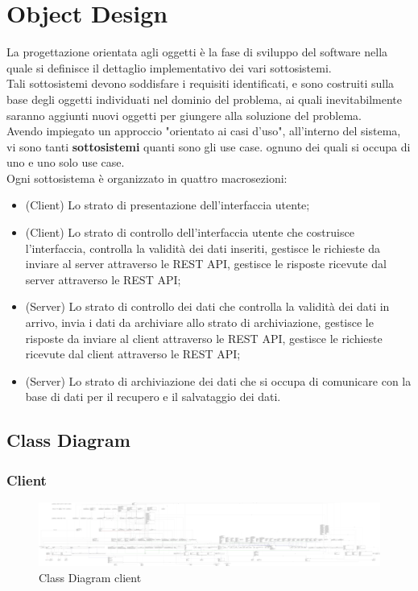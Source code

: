 \chapter{Object Design}
    La progettazione orientata agli oggetti è la fase di sviluppo del software nella quale si definisce il dettaglio implementativo dei vari sottosistemi. \\
    Tali sottosistemi devono soddisfare i requisiti identificati, e sono costruiti sulla base degli oggetti individuati nel dominio del problema, ai quali inevitabilmente saranno aggiunti nuovi oggetti per giungere alla soluzione del problema. \\
    Avendo impiegato un approccio "orientato ai casi d'uso", all'interno del sistema, vi sono tanti \textbf{sottosistemi} quanti sono gli use case. ognuno dei quali si occupa di uno e uno solo use case. \\
    Ogni sottosistema è organizzato in quattro macrosezioni:
    \begin{itemize}
        \item (Client) Lo strato di presentazione dell'interfaccia utente;
        \item (Client) Lo strato di controllo dell'interfaccia utente che costruisce l'interfaccia, controlla la validità dei dati inseriti, gestisce le richieste da inviare al server attraverso le REST API, gestisce le risposte ricevute dal server attraverso le REST API;
        \item (Server) Lo strato di controllo dei dati che controlla la validità dei dati in arrivo, invia i dati da archiviare allo strato di archiviazione, gestisce le risposte da inviare al client attraverso le REST API, gestisce le richieste ricevute dal client attraverso le REST API;
        \item (Server) Lo strato di archiviazione dei dati che si occupa di comunicare con la base di dati per il recupero e il salvataggio dei dati.
    \end{itemize}

    \section{Class Diagram}
        \subsection{Client}
            \begin{figure}[htbp!]
                \includegraphics[width=0.9\linewidth]{Immagini/Diagrammi/Class Diagram/ClientClassDiagram.pdf}
            \caption{Class Diagram client}
            \label{fig:Class Diagram client}
            \end{figure}
